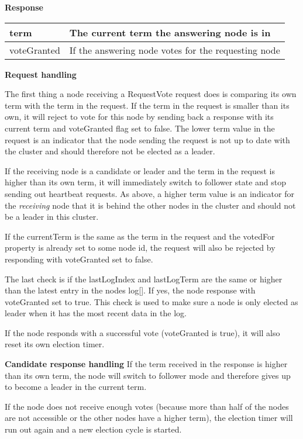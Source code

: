 \textbf{Response}

\begin{tabular}{ | l | p{13.7cm} | }
\hline
term & The current term the answering node is in \\ \hline
voteGranted & If the answering node votes for the requesting node \\ \hline
\end{tabular}

\textbf{Request handling}

The first thing a node receiving a RequestVote request does is comparing its own term with the term in the request. If the term in the request is smaller than its own, it will reject to vote for this node by sending back a response with its current term and voteGranted flag set to false. The lower term value in the request is an indicator that the node sending the request is not up to date with the cluster and should therefore not be elected as a leader.

If the receiving node is a candidate or leader and the term in the request is higher than its own term, it will immediately switch to follower state and stop sending out heartbeat requests.
As above, a higher term value is an indicator for the \textit{receiving} node that it is behind the other nodes in the cluster and should not be a leader in this cluster.

If the currentTerm is the same as the term in the request and the votedFor property is already set to some node id, the request will also be rejected by responding with voteGranted set to false.

The last check is if the lastLogIndex and lastLogTerm are the same or higher than the latest entry in the nodes log[]. If yes, the node response with voteGranted set to true. This check is used to make sure a node is only elected as leader when it has the most recent data in the log.

If the node responds with a successful vote (voteGranted is true), it will also reset its own election timer.

\textbf{Candidate response handling}
If the term received in the response is higher than its own term, the node will switch to follower mode and therefore gives up to become a leader in the current term.

If the node does not receive enough votes (because more than half of the nodes are not accessible or the other nodes have a higher term), the election timer will run out again and a new election cycle is started.


